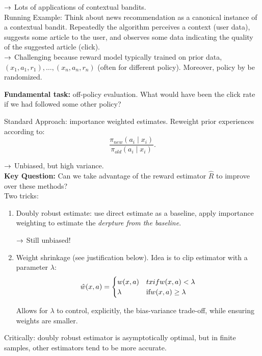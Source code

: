$\rightarrow$ Lots of applications of contextual bandits. \\

Running Example: Think about news recommendation as a canonical instance of a contextual bandit. Repeatedly the algorithm perceives a context (user data), suggests some article to the user, and observes some data indicating the quality of the suggested article (click). \\

$\rightarrow$ Challenging because reward model typically trained on prior data, $(x_1, a_1, r_1), \ldots, (x_n, a_n, r_n)$ (often for different policy). Moreover, policy by be randomized.

{\bf Fundamental task:} off-policy evaluation. What would have been the click rate if we had followed some other policy?

Standard Approach: importance weighted estimates. Reweight prior experiences according to:
\[
\frac{\pi_{new}(a_i \mid x_i)}{\pi_{old}(a_i \mid x_i)}.
\]

$\rightarrow$ Unbiased, but high variance. \\

{\bf Key Question:} Can we take advantage of the reward estimator $\hat{R}$ to improve over these methods? \\

Two tricks:
\begin{enumerate}
    \item Doubly robust estimate: use direct estimate as a baseline, apply importance weighting to estimate the {\it derpture from the baseline}.
    
    $\rightarrow$ Still unbiased!
    
    \item Weight shrinkage (see justification below). Idea is to clip estimator with a parameter $\lambda$:
    \[
    \hat{w}(x,a) = \begin{cases}
    w(x,a)& tx{if} w(x,a) < \lambda\\
    \lambda& \text{if} w(x,a) \geq \lambda
    \end{cases}
    \]
    
    Allows for $\lambda$ to control, explicitly, the bias-variance trade-off, while ensuring weights are smaller.
\end{enumerate}


Critically: doubly robust estimator is asymptotically optimal, but in finite samples, other estimators tend to be more accurate. \\


